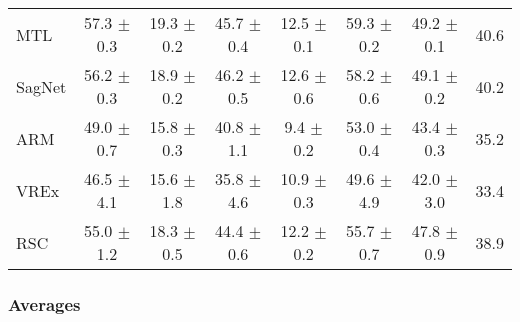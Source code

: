 \documentclass{article}
\begin{document}
\begin{center}
{\begin{tabular}{lccccccc}
MTL                  & 57.3 $\pm$ 0.3       & 19.3 $\pm$ 0.2       & 45.7 $\pm$ 0.4       & 12.5 $\pm$ 0.1       & 59.3 $\pm$ 0.2       & 49.2 $\pm$ 0.1       & 40.6                 \\
SagNet               & 56.2 $\pm$ 0.3       & 18.9 $\pm$ 0.2       & 46.2 $\pm$ 0.5       & 12.6 $\pm$ 0.6       & 58.2 $\pm$ 0.6       & 49.1 $\pm$ 0.2       & 40.2                 \\
ARM                  & 49.0 $\pm$ 0.7       & 15.8 $\pm$ 0.3       & 40.8 $\pm$ 1.1       & 9.4 $\pm$ 0.2        & 53.0 $\pm$ 0.4       & 43.4 $\pm$ 0.3       & 35.2                 \\
VREx                 & 46.5 $\pm$ 4.1       & 15.6 $\pm$ 1.8       & 35.8 $\pm$ 4.6       & 10.9 $\pm$ 0.3       & 49.6 $\pm$ 4.9       & 42.0 $\pm$ 3.0       & 33.4                 \\
RSC                  & 55.0 $\pm$ 1.2       & 18.3 $\pm$ 0.5       & 44.4 $\pm$ 0.6       & 12.2 $\pm$ 0.2       & 55.7 $\pm$ 0.7       & 47.8 $\pm$ 0.9       & 38.9                 \\
\bottomrule
\end{tabular}}
\end{center}

\subsubsection{Averages}
\end{document}
